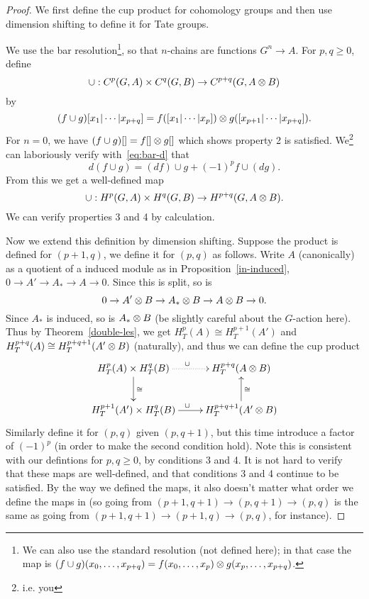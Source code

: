 \begin{proof}
We first define the cup product for cohomology groups and then use dimension shifting to define it for Tate groups.

%
We use the bar resolution\footnote{We can also use the standard resolution (not defined here); in that case the map is $(f\cup g)(x_0,\ldots, x_{p+q})=f(x_0,\ldots, x_p)\otimes g(x_p,\ldots, x_{p+q})$.}, so that $n$-chains are functions $G^n\to A$.
For $p,q\ge 0$, define
\[
\cup: C^p(G,A)\times C^q(G,B)\to C^{p+q}(G,A\otimes B)
\]
by
\[
(f\cup g)[x_1|\cdots |x_{p+q}] = f([x_1|\cdots |x_p])\otimes g([x_{p+1}|\cdots |x_{p+q}]).
\]
For $n=0$, %
we have $(f\cup g)[]=f[]\otimes g[]$ which shows property 2 is satisfied. We\footnote{i.e. you} can laboriously verify with~\eqref{eq:bar-d} that
\[
d(f\cup g)=(df)\cup g+(-1)^p f\cup (dg).
\]
From this we get a well-defined map
\[
\cup:H^p(G,A)\times H^q(G,B)\to H^{p+q}(G,A\otimes B).
\]
We can verify properties 3 and 4 by calculation.

Now we extend this definition by dimension shifting. Suppose the product is defined for $(p+1,q)$, we define it for $(p,q)$ as follows. Write $A$ (canonically) as a quotient of a induced module as in Proposition~\ref{in-induced}, $0\to A' \to A_*\to A\to 0$. Since this is split, so is
\[
0\to A'\otimes B\to A_*\otimes B\to A\otimes B\to 0.
\]
Since $A_*$ is induced, so is $A_*\otimes B$ (be slightly careful about the $G$-action here). Thus by Theorem~\ref{double-les}, we get $H_T^p(A)\cong H_T^{p+1}(A')$ and $H_T^{p+q}(A)\cong H_T^{p+q+1}(A'\otimes B)$ (naturally), and thus we can define the cup product
\[
\xymatrix{
H_T^{p}(A)\times H_T^q(B)\ar[d]^{\cong} \ar@{.>}[r]^{\cup} & H_T^{p+q}(A\ot B)\\
H_T^{p+1}(A')\times H_T^q(B) \ar[r]^{\cup} & H_T^{p+q+1}(A'\ot B)\ar[u]_{\cong}
}
\]
Similarly define it for $(p,q)$ given $(p,q+1)$, but this time introduce a factor of $(-1)^p$ (in order to make the second condition hold). Note this is consistent with our defintions for $p,q\ge 0$, by conditions 3 and 4. It is not hard to verify that these maps are well-defined, and that conditions 3 and 4 continue to be satisfied. By the way we defined the maps, it also doesn't matter what order we define the maps in (so going from $(p+1,q+1)\to (p,q+1)\to (p,q)$ is the same as going from $(p+1,q+1)\to (p+1,q)\to (p,q)$, for instance).


\end{proof}
